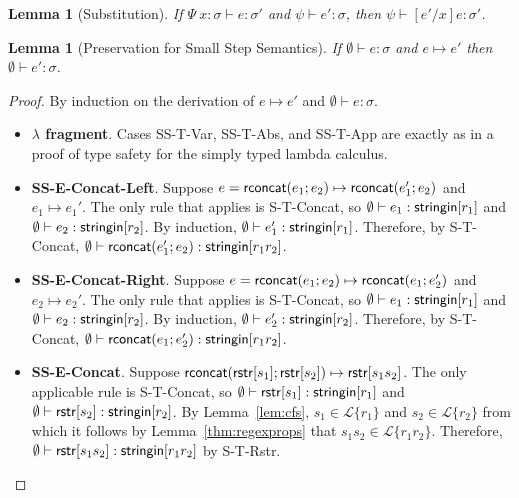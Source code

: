\documentclass[11pt,leqno]{article}
\newtheorem{trlem}[tr]{Lemma}
\theoremstyle{definition}
\newcommand{\Lagr}{\mathcal{L}}
\newcommand{\lang}[1]{\Lagr\{#1\}}
\newcommand{\stringin}[1]{{\sf stringin}[#1]}
\begin{document}
\begin{trlem}[Substitution] \label{lem:subst}
If $\Psi\ x : \sigma \vdash e : \sigma'$ and $\psi \vdash e' : \sigma$, then
$\psi \vdash [e' / x] e : \sigma'$.
\end{trlem}

\begin{trlem}[Preservation for Small Step Semantics]
If $\emptyset \vdash e : \sigma$ and $e \mapsto e'$ then $\emptyset \vdash e' : \sigma$.
\end{trlem}
\begin{proof}

By induction on the derivation of $e \mapsto e'$ and $\emptyset \vdash e : \sigma$.

\begin{itemize}[label=$ $,itemsep=1ex]
\item \textbf{$\lambda$ fragment}. Cases SS-T-Var, SS-T-Abs, and SS-T-App are exactly as in a proof of type safety for
the simply typed lambda calculus.

\item \textbf{SS-E-Concat-Left}.
Suppose $e = {\sf rconcat}(e_1;e_2) \mapsto {\sf rconcat}(e_1';e_2)$ and $e_1 \mapsto e_1'$.
The only rule that applies is S-T-Concat, so $\emptyset\vdash e_1 : \stringin{r_1}$ and $\emptyset\vdash e_2 : \stringin{r_2}$.
By induction, $\emptyset\vdash e_1' : \stringin{r_1}$.
Therefore, by S-T-Concat, $\emptyset\vdash \rconcat{e_1'}{e_2} : \stringin{r_1r_2}$.

\item {\textbf{SS-E-Concat-Right}}. 
Suppose $e = {\sf rconcat}(e_1;e_2) \mapsto {\sf rconcat}(e_1;e_2')$ and $e_2 \mapsto e_2'$.
The only rule that applies is S-T-Concat, so $\emptyset\vdash e_1 : \stringin{r_1}$ and $\emptyset\vdash e_2 : \stringin{r_2}$.
By induction, $\emptyset\vdash e_2' : \stringin{r_2}$.
Therefore, by S-T-Concat, $\emptyset\vdash \rconcat{e_1}{e_2'} : \stringin{r_1r_2}$.


\item \textbf{SS-E-Concat}. 
Suppose ${\sf rconcat}({\sf rstr}[s_1];{\sf rstr}[s_2]) \mapsto {\sf rstr}[s_1s_2]$.
The only applicable rule is S-T-Concat, so 
$\emptyset\vdash\rstr{s_1} : \stringin{r_1}$ 
and
$\emptyset\vdash\rstr{s_2} : \stringin{r_2}$. 
By Lemma~\ref{lem:cfs}, $s_1 \in \lang{r_1}$ and $s_2 \in  \lang{r_2}$ from which it follows by Lemma~\ref{thm:regexprops}
that $s_1s_2 \in \lang{r_1r_2}$. Therefore, $\emptyset\vdash \rstr{s_1s_2} : \stringin{r_1r_2}$ by S-T-Rstr.


\end{itemize}
\end{proof}
\end{document}
